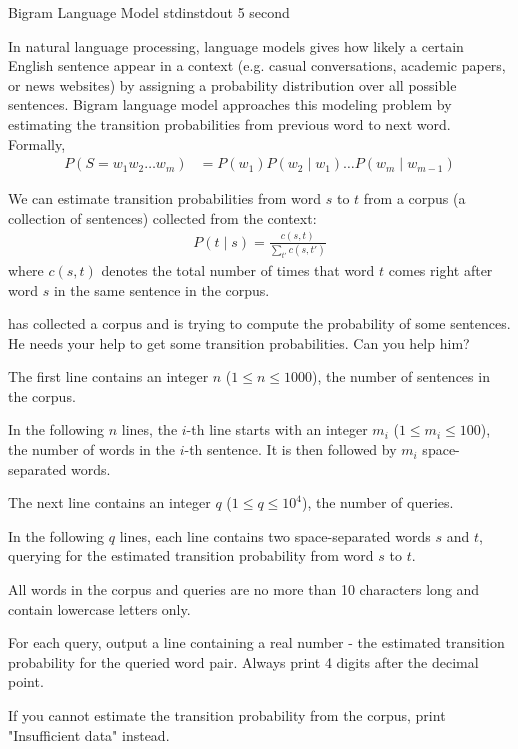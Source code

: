 
\begin{problem}{Bigram Language Model}
{stdin}{stdout}
{5 second}{}{}

In natural language processing, language models gives how likely a certain English sentence appear in a context (e.g. casual conversations, academic papers, or news websites) by assigning a probability distribution over all possible sentences. Bigram language model approaches this modeling problem by estimating the transition probabilities from previous word to next word. Formally,
\begin{align*}
	P(S = w_1 w_2 \hdots w_m) &= P(w_1)P(w_2 \mid w_1) \hdots P(w_m \mid w_{m-1})
\end{align*}

We can estimate transition probabilities from word $s$ to $t$ from a corpus (a collection of sentences) collected from the context:
\begin{align*}
	P(t \mid s) = \frac{c(s,t)}{\sum_{t'}{c(s,t')}}
\end{align*}
where $c(s,t)$ denotes the total number of times that word $t$ comes right after word $s$ in the same sentence in the corpus.

\Suzukaze has collected a corpus and is trying to compute the probability of some sentences. He needs your help to get some transition probabilities. Can you help him?

\InputFile

The first line contains an integer $n$ ($1 \le n \le 1000$), the number of sentences in the corpus.

In the following $n$ lines, the $i$-th line starts with an integer $m_i$ ($1 \le m_i \le 100$), the number of words in the $i$-th sentence. It is then followed by $m_i$ space-separated words.

The next line contains an integer $q$ ($1 \le q \le 10^4$), the number of queries.

In the following $q$ lines, each line contains two space-separated words $s$ and $t$, querying for the estimated transition probability from word $s$ to $t$.

All words in the corpus and queries are no more than 10 characters long and contain lowercase letters only.

\OutputFile

For each query, output a line containing a real number - the estimated transition probability for the queried word pair. Always print 4 digits after the decimal point.

If you cannot estimate the transition probability from the corpus, print "Insufficient data" instead.

\Examples

\begin{example}
%
\end{example}

\end{problem}
